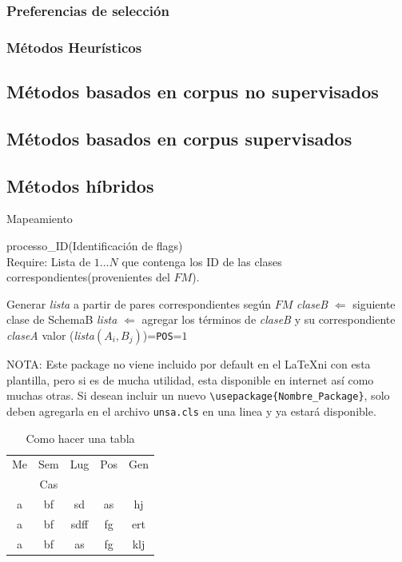 \subsubsection{Preferencias de selección}
\subsubsection{Métodos Heurísticos}
\subsection{Métodos basados en corpus no supervisados}
\subsection{Métodos basados en corpus supervisados}
\subsection{Métodos híbridos}

\bigskip
\begin{algorithm}
\caption{Mapeamiento}\label{mapeadoEVA} processo\_ID(Identificación de flags)\\
Require: Lista de ${1\ldots N}$ que contenga los ID de las clases
correspondientes(provenientes del $FM$).
\begin{algorithmic} [1]
\STATE Generar \emph{lista} a partir de pares correspondientes según
$FM$ 
\STATE
\emph{claseB} $\Longleftarrow$ siguiente clase de SchemaB \STATE
\emph{lista} $\Longleftarrow$ agregar los términos de \emph{claseB}
y su correspondiente \emph{claseA} \STATE valor
(\emph{lista$(A_{i},B_{j})$})=\verb"POS"=$1$ \ENDIF \ENDWHILE
\end{algorithmic}
\end{algorithm}

NOTA: Este package no viene incluido por default en el \LaTeX ni con
esta plantilla, pero si es de mucha utilidad, esta disponible en
internet así como muchas otras. Si desean incluir un nuevo
\verb"\usepackage{Nombre_Package}", solo deben agregarla en el
archivo \verb"unsa.cls" en una linea y ya estará disponible.

\begin{table}[h]
  \centering
  \begin{tabular}{|c|c|c|c|c|}
  \hline
  Me & Sem & Lug & Pos & Gen\\
  & Cas & & &\\
  \hline
  \hline
  a & bf & sd & as & hj \\
  a & bf & sdff & fg & ert \\
  a & bf & as & fg & klj \\
  \hline
\end{tabular}
  \caption{Como hacer una tabla}\label{tab:demo}
\end{table}


